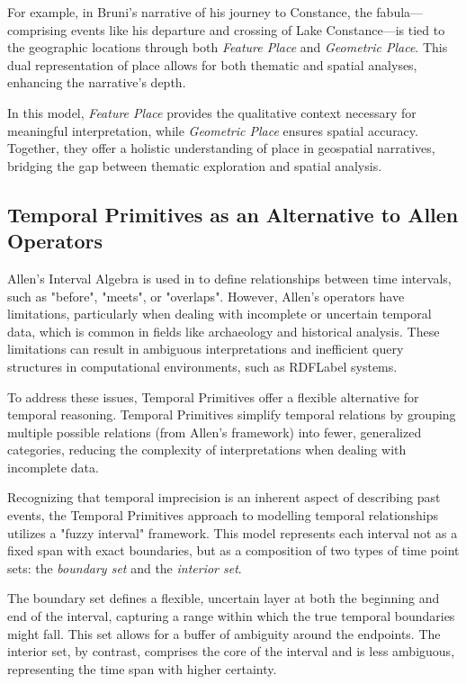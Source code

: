 For example, in Bruni’s narrative of his journey to Constance, the fabula—comprising events like his departure and crossing of Lake Constance—is tied to the geographic locations through both \textit{Feature Place} and \textit{Geometric Place}. This dual representation of place allows for both thematic and spatial analyses, enhancing the narrative’s depth.

In this model, \textit{Feature Place} provides the qualitative context necessary for meaningful interpretation, while \textit{Geometric Place} ensures spatial accuracy. Together, they offer a holistic understanding of place in geospatial narratives, bridging the gap between thematic exploration and spatial analysis.

\subsection{Temporal Primitives as an Alternative to Allen Operators}\label{V-subsec:temporalPrimitives}

Allen's Interval Algebra \cite{allenMaintainingKnowledgeTemporal1983} is used in \cite{meghiniRepresentingNarrativesDigital2021} to define relationships between time intervals, such as "before", "meets", or "overlaps". However, Allen's operators have limitations, particularly when dealing with incomplete or uncertain temporal data, which is common in fields like archaeology and historical analysis. These limitations can result in ambiguous interpretations and inefficient query structures in computational environments, such as \acrshort{RDFLabel} systems.

To address these issues, Temporal Primitives \cite{papadakisTemporalPrimitivesAlternative2015} offer a flexible alternative for temporal reasoning. Temporal Primitives simplify temporal relations by grouping multiple possible relations (from Allen’s framework) into fewer, generalized categories, reducing the complexity of interpretations when dealing with incomplete data. 

Recognizing that temporal imprecision is an inherent aspect of describing past events, the Temporal Primitives approach to modelling temporal relationships utilizes a "fuzzy interval" framework. This model represents each interval not as a fixed span with exact boundaries, but as a composition of two types of time point sets: the \textit{boundary set} and the \textit{interior set}.

The boundary set defines a flexible, uncertain layer at both the beginning and end of the interval, capturing a range within which the true temporal boundaries might fall. This set allows for a buffer of ambiguity around the endpoints. The interior set, by contrast, comprises the core of the interval and is less ambiguous, representing the time span with higher certainty.


